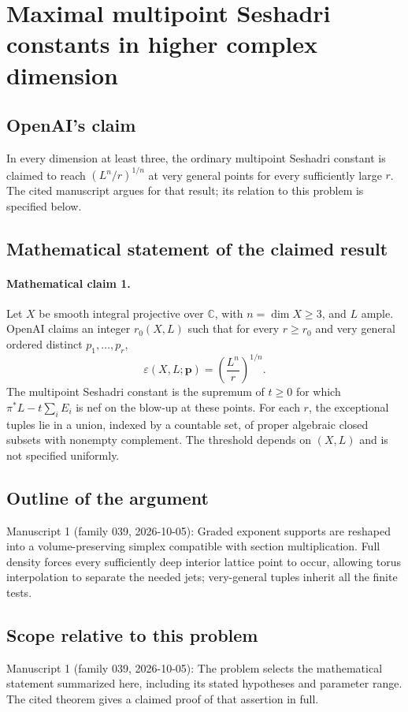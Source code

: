\documentclass[11pt]{article}
\begin{document}
\section*{Maximal multipoint Seshadri constants in higher complex dimension}

\subsection{OpenAI's claim}
In every dimension at least three, the ordinary multipoint Seshadri constant is claimed to reach $(L^n/r)^{1/n}$ at very general points for every sufficiently large $r$. The cited manuscript argues for that result; its relation to this problem is specified below.

\subsection{Mathematical statement of the claimed result}
\paragraph{Mathematical claim 1.} Let $X$ be smooth integral projective over $\mathbb C$, with $n=\dim X\ge3$, and $L$ ample. OpenAI claims an integer $r_0(X,L)$ such that for every $r\ge r_0$ and very general ordered distinct $p_1,\ldots,p_r$,
\[
\varepsilon(X,L;\mathbf p)=\left(\frac{L^n}{r}\right)^{1/n}.
\]
The multipoint Seshadri constant is the supremum of $t\ge0$ for which $\pi^*L-t\sum_iE_i$ is nef on the blow-up at these points. For each $r$, the exceptional tuples lie in a union, indexed by a countable set, of proper algebraic closed subsets with nonempty complement. The threshold depends on $(X,L)$ and is not specified uniformly.

\subsection{Outline of the argument}
Manuscript 1 (family 039, 2026-10-05): Graded exponent supports are reshaped into a volume-preserving simplex compatible with section multiplication. Full density forces every sufficiently deep interior lattice point to occur, allowing torus interpolation to separate the needed jets; very-general tuples inherit all the finite tests.

\subsection{Scope relative to this problem}
Manuscript 1 (family 039, 2026-10-05): The problem selects the mathematical statement summarized here, including its stated hypotheses and parameter range. The cited theorem gives a claimed proof of that assertion in full.
\end{document}
